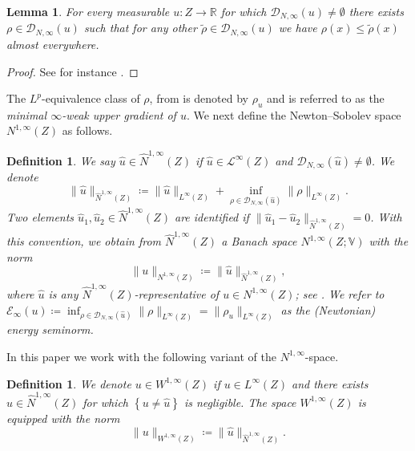 \documentclass[reqno]{amsart}
\numberwithin{equation}{section}
\newtheorem{lemma}[theorem]{Lemma}
\newtheorem{definition}[theorem]{Definition}
\theoremstyle{remark}
\newcommand{\R}{\mathbb{R}}
\begin{document}
\begin{lemma}\label{lem:minimal-upper-grad.}
    For every measurable $u\colon Z\to \R$ for which $\mathcal D_{N,\infty}(u)\neq \emptyset$ there exists $\rho\in \mathcal D_{N,\infty}(u)$ such that for any other $\widetilde \rho \in \mathcal D_{N,\infty}(u)$ we have $\rho(x)\leq \widetilde \rho(x)$ almost everywhere. 
    \end{lemma}  
\begin{proof}
    See for instance \cite{M2013}.
\end{proof}
The $L^p$-equivalence class of $\rho$, from  is denoted by $\rho_u$ and is referred to as the {\em minimal $\infty$-weak upper gradient of $u$}. We next define the Newton--Sobolev space $N^{1,\infty}(Z)$ as follows. 
\begin{definition}\label{def:N1P}
We say $\widehat{u} \in \widehat{N}^{1,\infty}( Z )$ if $\widehat{u} \in \mathcal{L}^\infty(Z)$ and $\mathcal{D}_{N,\infty}( \widehat{u} ) \neq \emptyset$. We denote
\begin{equation*}
    \| \widehat{u} \|_{ \widehat{N}^{1,\infty}(Z) }
    \coloneqq
    \| \widehat{u} \|_{L^\infty(Z)}
    +
    \inf_{ \rho \in \mathcal{D}_{N,\infty}( \widehat{u} ) }\| \rho\|_{L^\infty(Z)}.
\end{equation*}
Two elements $\widehat{u}_{1}, \widehat{u}_{2} \in \widehat{N}^{1,\infty}( Z )$ are identified if $\| \widehat{u}_{1} - \widehat{u}_{2} \|_{ \widehat{N}^{1,\infty}(Z) } = 0$. With this convention, we obtain from $\widehat{N}^{1,\infty}( Z )$  a Banach space $N^{1,\infty}( Z; \mathbb{V} )$ with the norm
\begin{equation*}
    \| u \|_{ N^{1,\infty}(Z ) }
    \coloneqq
    \| \widehat{u} \|_{ \widehat{N}^{1,\infty}(Z) },
\end{equation*}
where $\widehat{u}$ is any $\widehat{N}^{1,\infty}( Z )$-representative of ${u} \in N^{1,\infty}(Z) $; see \cite[Section 7.1]{HKST2015}. We refer to $\mathscr{E}_{\infty}(u) \coloneqq \inf_{ \rho \in \mathcal{D}_{N,\infty}( \widehat{u} ) }\| \rho\|_{L^\infty(Z)}=\|\rho_u\|_{L^\infty(Z)}$ as the (Newtonian) energy seminorm.
\end{definition}
In this paper we work with the following variant of the $N^{1,\infty}$-space.
\begin{definition}\label{def:Dir}
We denote $u \in W^{1,\infty}( Z )$ if $u \in L^{\infty}( Z )$ and there exists $\widehat{u} \in \widehat{N}^{1,\infty}( Z )$ for which $\left\{ u \neq \widehat{u} \right\}$ is negligible. The space $W^{1,\infty}( Z )$ is equipped with the norm
\begin{equation*}
    \|u\|_{W^{1, \infty}(Z)}
    \coloneqq
    \| \widehat{u} \|_{ \widehat{N}^{1,\infty}(Z) }.
\end{equation*}
\end{definition}
\end{document}
